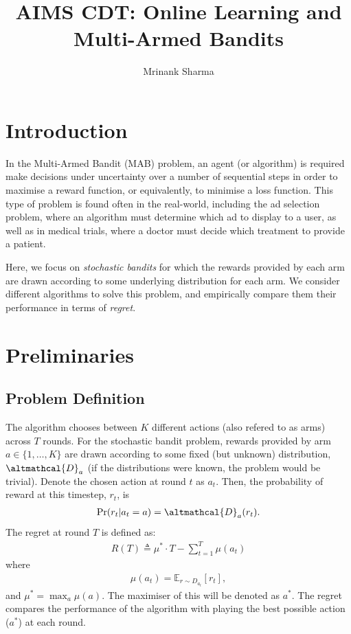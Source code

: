 \documentclass[a4paper]{article}
\title{\vspace{-2cm}AIMS CDT: Online Learning and Multi-Armed Bandits}
\author{Mrinank Sharma}
\date{}
\begin{document}
	\maketitle
	
	\section{Introduction}
	In the Multi-Armed Bandit (MAB) problem, an agent (or algorithm) is required make decisions under uncertainty over a number of sequential steps in order to maximise a reward function, or equivalently, to minimise a loss function. This type of problem is found often in the real-world, including the ad selection problem, where an algorithm must determine which ad to display to a user, as well as in medical trials, where a doctor must decide which treatment to provide a patient.
	
	Here, we focus on \emph{stochastic bandits} for which the rewards provided by each arm are drawn according to some underlying distribution for each arm. We consider different algorithms to solve this problem, and empirically compare them their performance in terms of \emph{regret}. 
	
	\section{Preliminaries}
	\subsection{Problem Definition}
	The algorithm chooses between $K$ different actions (also refered to as arms) across $T$ rounds. For the stochastic bandit problem, rewards provided by arm $a \in  \lbrace 1, \ldots, K \rbrace$ are drawn according to some fixed (but unknown) distribution, $\altmathcal{D}_a$ (if the distributions were known, the problem would be trivial). Denote the chosen action at round $t$ as $a_t$. Then, the probability of reward at this timestep, $r_t$, is
	\begin{align}
	\text{Pr}(r_t | a_t = a) = \altmathcal{D}_a(r_t).
	\end{align}
	The regret at round $T$ is defined as:
	\begin{align}
	R(T) \triangleq \mu^* \cdot T - \sum_{t=1}^{T} \mu(a_t)
	\end{align}
	where
	\begin{align}
	\mu(a_t) = \mathbb{E}_{r \sim D_{a_t}}[r_t],
	\end{align}
	and $\mu^* = \max_{a} \mu(a)$. The maximiser of this will be denoted as $a^*$. The regret compares the performance of the algorithm with playing the best possible action ($a^*$) at each round. 
	
\end{document}
